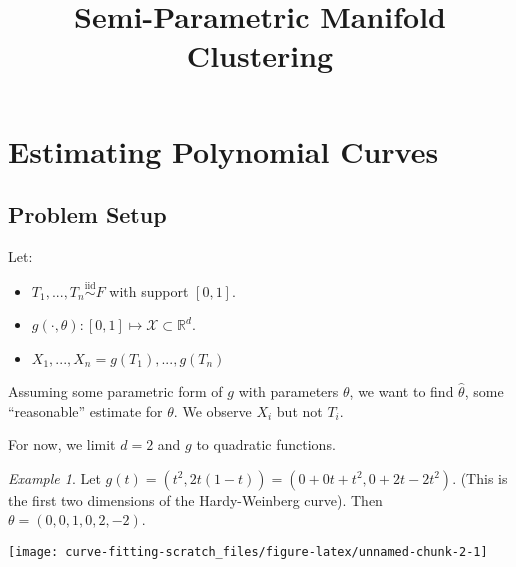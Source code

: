 \documentclass[
  11pt,
]{article}
\title{Semi-Parametric Manifold Clustering}
\author{}
\date{\vspace{-2.5em}}
\providecommand{\tightlist}{%
  \setlength{\itemsep}{0pt}\setlength{\parskip}{0pt}}
\begin{document}
\maketitle

\newcommand{\diag}{\mathrm{diag}}
\newcommand{\tr}{\mathrm{Tr}}
\newcommand{\blockdiag}{\mathrm{blockdiag}}
\newcommand{\indep}{\stackrel{\mathrm{ind}}{\sim}}
\newcommand{\iid}{\stackrel{\mathrm{iid}}{\sim}}
\newcommand{\Bernoulli}{\mathrm{Bernoulli}}
\newcommand{\Betadist}{\mathrm{Beta}}
\newcommand{\Uniform}{\mathrm{Uniform}}
\newcommand{\BG}{\mathrm{BernoulliGraph}}
\newcommand{\Categorical}{\mathrm{Categorical}}
\newcommand{\Multinomial}{\mathrm{Multinomial}}
\newcommand{\RDPG}{\mathrm{RDPG}}
\newcommand{\GRDPG}{\mathrm{GRDPG}}
\newtheorem{definition}{Definition}
\newtheorem{theorem}{Theorem}
\newtheorem{lemma}{Lemma}
\theoremstyle{remark}
\newtheorem*{remark}{Remark}
\theoremstyle{example}
\newtheorem{example}{Example}
\newcommand{\dd}{\mathrm{d}}
\newcommand{\as}{\stackrel{\mathrm{a.s.}}{\to}}
\newcommand{\ind}{\stackrel{\mathrm{ind}}{\sim}}

\hypertarget{estimating-polynomial-curves}{%
\section{Estimating Polynomial
Curves}\label{estimating-polynomial-curves}}

\hypertarget{problem-setup}{%
\subsection{Problem Setup}\label{problem-setup}}

Let:

\begin{itemize}
\tightlist
\item
  \(T_1, ..., T_n \stackrel{\mathrm{iid}}{\sim}F\) with support
  \([0, 1]\).
\item
  \(g(\cdot, \theta) : [0, 1] \mapsto \mathcal{X} \subset \mathbb{R}^d\).
\item
  \(X_1, ..., X_n = g(T_1), ..., g(T_n)\)
\end{itemize}

Assuming some parametric form of \(g\) with parameters \(\theta\), we
want to find \(\hat{\theta}\), some ``reasonable'' estimate for
\(\theta\). We observe \(X_i\) but not \(T_i\).

For now, we limit \(d = 2\) and \(g\) to quadratic functions.

\begin{example}

Let $g(t) = (t^2, 2 t (1 - t) ) = (0 + 0 t + t^2, 0 + 2 t - 2 t^2)$. 
(This is the first two dimensions of the Hardy-Weinberg curve). 
Then $\theta = (0, 0, 1, 0, 2, -2)$.


\begin{center}\texttt{[image: curve-fitting-scratch\_files/figure-latex/unnamed-chunk-2-1]} \end{center}

\end{example}
\end{document}
